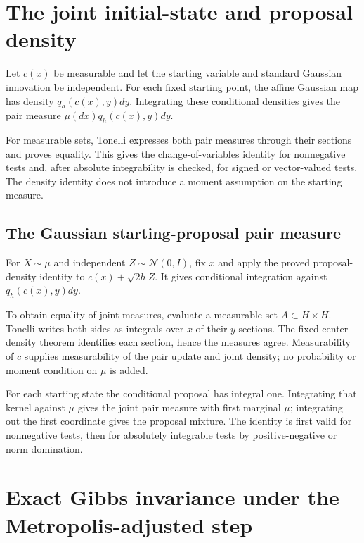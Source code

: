 \documentclass[11pt,a4paper]{article}
\begin{document}
\section{\texorpdfstring{The joint initial-state and proposal density}{The joint initial-state and proposal density}}


Let \(c(x)\) be measurable and let the starting variable and standard Gaussian innovation be independent. For each fixed starting point, the affine Gaussian map has density \(q_h(c(x),y)dy\). Integrating these conditional densities gives the pair measure \(\mu(dx)q_h(c(x),y)dy\).



For measurable sets, Tonelli expresses both pair measures through their sections and proves equality. This gives the change-of-variables identity for nonnegative tests and, after absolute integrability is checked, for signed or vector-valued tests. The density identity does not introduce a moment assumption on the starting measure.


\subsection{\texorpdfstring{The Gaussian starting-proposal pair measure}{The Gaussian starting-proposal pair measure}}


For \(X\sim\mu\) and independent \(Z\sim\mathcal N(0,I)\), fix \(x\) and apply the proved proposal-density identity to \(c(x)+\sqrt{2h}Z\). It gives conditional integration against \(q_h(c(x),y)dy\).



To obtain equality of joint measures, evaluate a measurable set \(A\subset H\times H\). Tonelli writes both sides as integrals over \(x\) of their \(y\)-sections. The fixed-center density theorem identifies each section, hence the measures agree. Measurability of \(c\) supplies measurability of the pair update and joint density; no probability or moment condition on \(\mu\) is added.



For each starting state the conditional proposal has integral one. Integrating that kernel against \(\mu\) gives the joint pair measure with first marginal \(\mu\); integrating out the first coordinate gives the proposal mixture. The identity is first valid for nonnegative tests, then for absolutely integrable tests by positive-negative or norm domination.


\section{\texorpdfstring{Exact Gibbs invariance under the Metropolis-adjusted step}{Exact Gibbs invariance under the Metropolis-adjusted step}}
\end{document}
